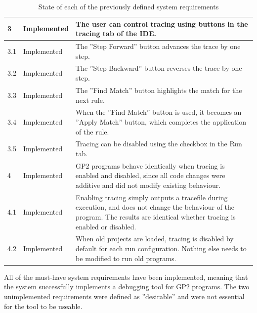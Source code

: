 \documentclass[authoryearcitations]{UoYCSproject}
\begin{document}
\begin{table}[!htb]
\begin{tabularx}{\linewidth}{|l|l|X|}
        3    &  Implemented     & The user can control tracing using buttons in the tracing
                                  tab of the IDE. \\ \hline
        3.1  &  Implemented     & The ''Step Forward'' button advances the trace by one
                                  step. \\ \hline
        3.2  &  Implemented     & The ''Step Backward'' button reverses the trace by one
                                  step. \\ \hline
        3.3  &  Implemented     & The ''Find Match'' button highlights the match for the
                                  next rule. \\ \hline
        3.4  &  Implemented     & When the ''Find Match'' button is used, it becomes an
                                  ''Apply Match'' button, which completes the application
                                  of the rule. \\ \hline
        3.5  &  Implemented     & Tracing can be disabled using the checkbox in the Run tab.
                                  \\ \hline
                
        4    &  Implemented     & GP2 programs behave identically when tracing is enabled
                                  and disabled, since all code changes were additive and did
                                  not modify existing behaviour. \\ \hline
        4.1  &  Implemented     & Enabling tracing simply outputs a tracefile during execution,
                                  and does not change the behaviour of the program. The results
                                  are identical whether tracing is enabled or disabled. \\ \hline
        4.2  &  Implemented     & When old projects are loaded, tracing is disabled by
                                  default for each run configuration. Nothing else needs
                                  to be modified to run old programs. \\ \hline
                
    \end{tabularx}
    \caption{State of each of the previously defined system requirements}
    \label{tab:RequirementsTracing}
\end{table}

All of the must-have system requirements have been implemented, meaning that the
system successfully implements a debugging tool for GP2 programs. The two
unimplemented requirements were defined as ''desirable'' and were not essential
for the tool to be useable.
\end{document}
